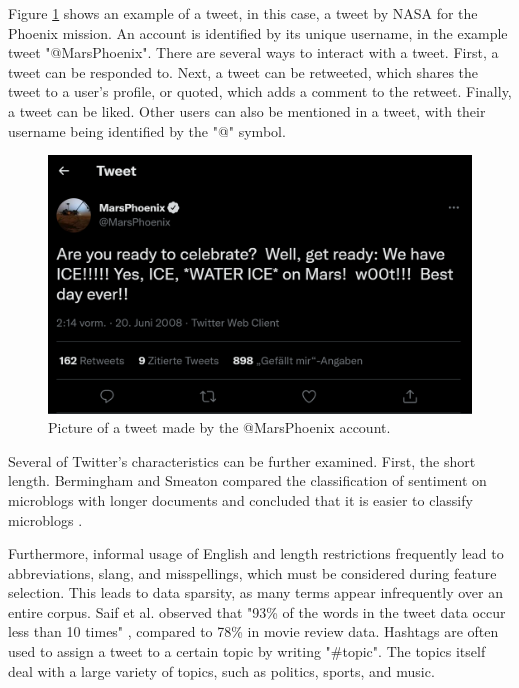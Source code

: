 Figure \ref{fig:example_tweet} shows an example of a tweet, in this case, a tweet by NASA for the Phoenix mission. An account is identified by its unique username, in the example tweet "@MarsPhoenix". There are several ways to interact with a tweet. First, a tweet can be responded to. Next, a tweet can be retweeted, which shares the tweet to a user's profile, or quoted, which adds a comment to the retweet. Finally, a tweet can be liked. Other users can also be mentioned in a tweet, with their username being identified by the "@" symbol. 

\begin{figure}
    \centering
    \includegraphics[scale=0.3]{Images/twitter_image.png}
    \caption{Picture of a tweet made by the @MarsPhoenix account. }
    \label{fig:example_tweet}
\end{figure}

Several of Twitter's characteristics can be further examined.
First, the short length. Bermingham and Smeaton compared the classification of sentiment on microblogs with longer documents and concluded that it is easier to classify microblogs \cite{microblogs}.

Furthermore, informal usage of English and length restrictions frequently lead to abbreviations, slang, and misspellings, which must be considered during feature selection. This leads to data sparsity, as many terms appear infrequently over an entire corpus. Saif et al. observed that "93\% of the words in the tweet data occur less than 10 times" \cite[p.~3]{data_sparsity}, compared to 78\% in movie review data. Hashtags are often used to assign a tweet to a certain topic by writing "\#topic". The topics itself deal with a large variety of topics, such as politics, sports, and music.


